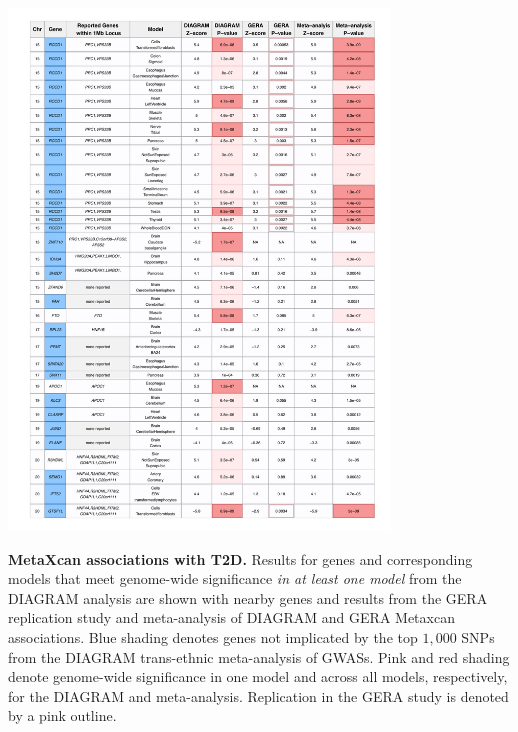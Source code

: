 \documentclass[10pt]{article}
\begin{document}
\clearpage
\begin{table}
\ContinuedFloat
	\includegraphics[width=0.76\textwidth]{supp_tab1_part6.pdf}
	\caption{\textbf{MetaXcan associations with T2D.} Results for genes and corresponding models that meet genome-wide significance \textit{in at least one model} from the DIAGRAM analysis are shown with nearby genes and results from the GERA replication study and meta-analysis of DIAGRAM and GERA Metaxcan associations. Blue shading denotes genes not implicated by the top $1,000$ SNPs from the DIAGRAM trans-ethnic meta-analysis of GWASs. Pink and red shading denote genome-wide significance in one model and across all models, respectively, for the DIAGRAM and meta-analysis. Replication in the GERA study is denoted by a pink outline.} 
	\label{tab:supp.table1.part6}
\end{table}

\end{document}
